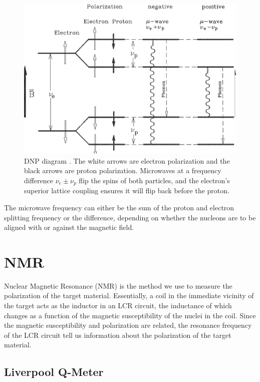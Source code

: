 \begin{figure}
 \centering
 \includegraphics[scale=.25]{img/dnp.png}
 \caption{DNP diagram \cite{dnpdiagram}.  The white arrows are electron polarization and the black arrows are proton polarization.  Microwaves at a frequency difference $\nu_e\pm\nu_p$ flip the spins of both particles, and the electron's superior lattice coupling ensures it will flip back before the proton.}
 \label{fig:dnp-diagram}
\end{figure}


The microwave frequency can either be the sum of the proton and electron splitting frequency or the difference, depending on whether the nucleons are to be aligned with or against the magnetic field. 
\section{NMR}

Nuclear Magnetic Resonance (NMR) is the method we use to measure the polarization of the target material.  Essentially, a coil in the immediate vicinity of the target acts as the inductor in an LCR circuit, the inductance of which changes as a function of the magnetic susceptibility of the nuclei in the coil.  Since the magnetic susceptibility and polarization are related, the resonance frequency of the LCR circuit tell us information about the polarization of the target material\cite{qmeterbook}. 

\subsection{Liverpool Q-Meter}

